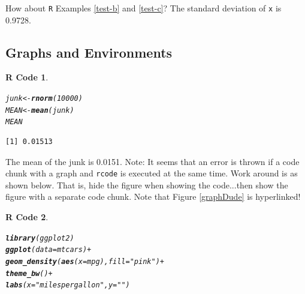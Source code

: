 \documentclass{article}\usepackage[]{graphicx}\usepackage[]{color}
\makeatletter
\newcommand{\hlnum}[1]{\textcolor[rgb]{0.686,0.059,0.569}{#1}}%
\newcommand{\hlstr}[1]{\textcolor[rgb]{0.192,0.494,0.8}{#1}}%
\newcommand{\hlopt}[1]{\textcolor[rgb]{0,0,0}{#1}}%
\newcommand{\hlstd}[1]{\textcolor[rgb]{0.345,0.345,0.345}{#1}}%
\newcommand{\hlkwb}[1]{\textcolor[rgb]{0.69,0.353,0.396}{#1}}%
\newcommand{\hlkwc}[1]{\textcolor[rgb]{0.333,0.667,0.333}{#1}}%
\newcommand{\hlkwd}[1]{\textcolor[rgb]{0.737,0.353,0.396}{\textbf{#1}}}%
\newenvironment{kframe}{%
 \def\at@end@of@kframe{}%
 \ifinner\ifhmode%
  \def\at@end@of@kframe{\end{minipage}}%
  \begin{minipage}{\columnwidth}%
 \fi\fi%
 \def\FrameCommand##1{\hskip\@totalleftmargin \hskip-\fboxsep
 \colorbox{shadecolor}{##1}\hskip-\fboxsep
     \hskip-\linewidth \hskip-\@totalleftmargin \hskip\columnwidth}%
 \MakeFramed {\advance\hsize-\width
   \@totalleftmargin\z@ \linewidth\hsize
   \@setminipage}}%
 {\par\unskip\endMakeFramed%
 \at@end@of@kframe}
\newenvironment{knitrout}{}{} %
\newtheorem{rcode}{R Code}[section]
\makeatother
\begin{document}
\noindent
How about \texttt{R} Examples \ref{test-b} and \ref{test-c}?  The standard deviation of \texttt{x} is 0.9728.

\clearpage
\subsection{Graphs and Environments}

\begin{knitrout}
\color{fgcolor}\begin{kframe}
\begin{rcode}\label{plot1}\hfill{}\begin{alltt}
\hlstd{junk} \hlkwb{<-} \hlkwd{rnorm}\hlstd{(}\hlnum{10000}\hlstd{)}
\hlstd{MEAN} \hlkwb{<-} \hlkwd{mean}\hlstd{(junk)}
\hlstd{MEAN}
\end{alltt}
\begin{verbatim}
[1] 0.01513
\end{verbatim}
\end{rcode}\end{kframe}
\end{knitrout}


The mean of the junk is 0.0151.  Note: It seems that an error is thrown if
a code chunk with a graph and \texttt{rcode} is executed at the same time.  Work around is
as shown below.  That is, hide the figure when showing the code...then show the figure
with a separate code chunk.  Note that Figure \ref{graphDude} is hyperlinked!

\begin{knitrout}
\color{fgcolor}\begin{kframe}
\begin{rcode}\label{Graph}\hfill{}\begin{alltt}
\hlkwd{library}\hlstd{(ggplot2)}
\hlkwd{ggplot}\hlstd{(}\hlkwc{data} \hlstd{= mtcars)} \hlopt{+}
  \hlkwd{geom_density}\hlstd{(}\hlkwd{aes}\hlstd{(}\hlkwc{x} \hlstd{= mpg),} \hlkwc{fill} \hlstd{=} \hlstr{"pink"}\hlstd{)} \hlopt{+}
  \hlkwd{theme_bw}\hlstd{()} \hlopt{+}
  \hlkwd{labs}\hlstd{(}\hlkwc{x} \hlstd{=} \hlstr{"miles per gallon"}\hlstd{,} \hlkwc{y} \hlstd{=} \hlstr{""}\hlstd{)}
\end{alltt}
\end{rcode}\end{kframe}
\end{knitrout}
\end{document}
